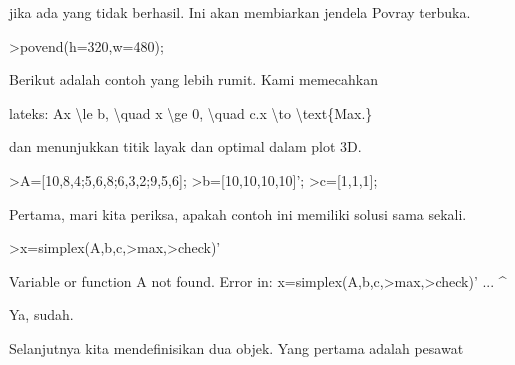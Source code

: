 \documentclass[a4paper,10pt]{article}
\begin{document}
\begin{eulernotebook}
\begin{eulercomment}
\begin{eulercomment}
\begin{eulercomment}
jika ada yang tidak berhasil. Ini akan membiarkan jendela Povray
terbuka.
\end{eulercomment}
\begin{eulerprompt}
>povend(h=320,w=480);
\end{eulerprompt}
\begin{eulercomment}
Berikut adalah contoh yang lebih rumit. Kami memecahkan

lateks: Ax \textbackslash{}le b, \textbackslash{}quad x \textbackslash{}ge 0, \textbackslash{}quad c.x \textbackslash{}to \textbackslash{}text\{Max.\}

dan menunjukkan titik layak dan optimal dalam plot 3D.
\end{eulercomment}
\begin{eulerprompt}
>A=[10,8,4;5,6,8;6,3,2;9,5,6];
>b=[10,10,10,10]';
>c=[1,1,1];
\end{eulerprompt}
\begin{eulercomment}
Pertama, mari kita periksa, apakah contoh ini memiliki solusi sama
sekali.
\end{eulercomment}
\begin{eulerprompt}
>x=simplex(A,b,c,>max,>check)'
\end{eulerprompt}
\begin{euleroutput}
  Variable or function A not found.
  Error in:
  x=simplex(A,b,c,>max,>check)' ...
             ^
\end{euleroutput}
\begin{eulercomment}
Ya, sudah.

Selanjutnya kita mendefinisikan dua objek. Yang pertama adalah pesawat


\end{eulercomment}
\end{eulercomment}
\end{eulercomment}
\end{eulernotebook}
\end{document}
